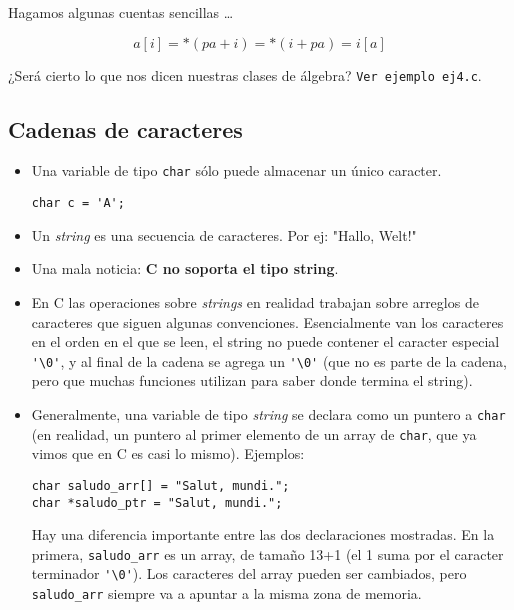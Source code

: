 \documentclass[12pt,a4paper,spanish]{article}
\begin{document}
Hagamos algunas cuentas sencillas \ldots

\[ a[i] = *(pa + i) = *(i + pa) = i[a] \]

¿Será cierto lo que nos dicen nuestras clases de álgebra?
\verb+Ver ejemplo ej4.c+.

\subsection*{Cadenas de caracteres}

\begin{itemize}

\item Una variable de tipo \texttt{char} sólo puede almacenar un único
caracter.

\begin{verbatim}
char c = 'A';
\end{verbatim}

\item Un \textit{string} es una secuencia de caracteres. Por ej: "Hallo,
Welt!"

\item Una mala noticia: \textbf{\textsf{C} no soporta el tipo string}.

\item En \textsf{C} las operaciones sobre \textit{strings} en realidad trabajan
sobre arreglos de caracteres que siguen algunas convenciones. Esencialmente
van los caracteres en el orden en el que se leen, el string no puede contener
el caracter especial \verb|'\0'|, y al final de la cadena se agrega un
\verb|'\0'| (que no es parte de la cadena, pero que muchas funciones utilizan
para saber donde termina el string).

\item Generalmente, una variable de tipo \textit{string} se declara como
un puntero a \verb+char+ (en realidad, un puntero al primer elemento de un
array de \verb|char|, que ya vimos que en C es casi lo mismo). Ejemplos:

\begin{verbatim}
char saludo_arr[] = "Salut, mundi.";
char *saludo_ptr = "Salut, mundi.";
\end{verbatim}

Hay una diferencia importante entre las dos declaraciones mostradas. En
la primera, \verb+saludo_arr+ es un array, de tamaño 13+1 (el 1 suma por
el caracter terminador \verb|'\0'|). Los caracteres del array pueden ser
cambiados, pero \verb+saludo_arr+ siempre va a apuntar a la misma zona
de memoria.


\end{itemize}
\end{document}
